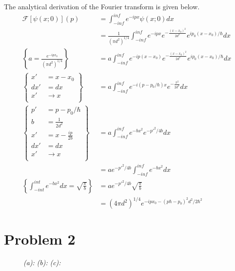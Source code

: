 The analytical derivation of the Fourier transform is given below.
\begin{equation}
\begin{split}
	\mathcal{F}\left[\psi(x;0)\right](p) 							& =  \int_{-inf}^{inf} e^{-ipx} \psi(x;0) dx \\
 																	& = \frac{1}{(\pi d^2)^{1/4}}\int_{-inf}^{inf}e^{-ipx}e^{-\frac{(x-x_0)^2}{2d^2}} e^{ip_0(x-x_0)/\hbar}dx\\
\left\{a=\frac{e^{-ipx_0}}{(\pi d^2)^{1/4}}\right\}					& = a \int_{-inf}^{inf}e^{-ip(x-x_0)}e^{-\frac{(x-x_0)^2}{2d^2}}e^{ip_0(x-x_0)/\hbar} dx\\
\left\{
\begin{array}{ll}
x'	& = x-x_0\\
dx' & = dx   \\
x'	& \rightarrow x\\
\end{array}
\right\} 															& = a\int_{-inf}^{inf}e^{-i(p-p_0/\hbar)x}e^{-\frac{x^2}{2d^2}}dx \\
\left\{
\begin{array}{ll}
p'		& = p-p_0/\hbar\\
b		& = \frac{1}{2d^2}   \\
x'		& = x-\frac{ip}{2b}\\
dx'		& = dx\\
x'		& \rightarrow x\\
\end{array}
\right\}															& = a\int_{-inf}^{inf}e^{-bx^2}e^{-p'^2/4b} dx\\
																	& = ae^{-p'^2/4b}\int_{-inf}^{inf}e^{-bx^2} dx\\
\left\{\int_{-int}^{int}e^{-bx^2}dx=\sqrt{\frac{\pi}{b}}\right\}	& = ae^{-p'^2/4b}\sqrt{\frac{\pi}{b}}\\
																	& = (4\pi d^2)^{1/4}e^{-ipx_0-(p\hbar-p_0)^2d^2/2\hbar^2}
\end{split}
\end{equation}


\section*{Problem 2}

\begin{figure}
\centering
\begin{subfigure}[t]{0.7\textwidth}
\caption{}
\label{fig:2_a}
\end{subfigure}

\begin{subfigure}[t]{0.7\textwidth}
\caption{}
\label{fig:2_b}
\end{subfigure}

\begin{subfigure}[t]{0.7\textwidth}
\caption{}
\label{fig:2_c}
\end{subfigure}

\caption{
	\textit{(a):}  
	\textit{(b):} 
	\textit{(c):} 
}
\label{fig:2}
\end{figure}

